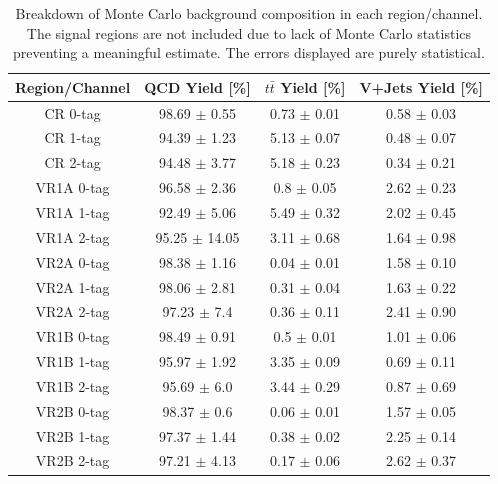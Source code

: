 \begin{table}[!htb]
\begin{center}
\begin{tabular}{|c|c|c|c|}
\hline
Region/Channel & QCD Yield [\%] & $t\bar{t}$ Yield [\%] & V+Jets Yield [\%]  \\ \hline
CR 0-tag & 98.69 $\pm$ 0.55 & 0.73 $\pm$ 0.01 & 0.58 $\pm$ 0.03 \\
\hline
CR 1-tag & 94.39 $\pm$ 1.23 & 5.13 $\pm$ 0.07 & 0.48 $\pm$ 0.07 \\
\hline
CR 2-tag & 94.48 $\pm$ 3.77 & 5.18 $\pm$ 0.23 & 0.34 $\pm$ 0.21 \\
\hline
VR1A 0-tag & 96.58 $\pm$ 2.36 & 0.8 $\pm$ 0.05 & 2.62 $\pm$ 0.23 \\
\hline
VR1A 1-tag & 92.49 $\pm$ 5.06 & 5.49 $\pm$ 0.32 & 2.02 $\pm$ 0.45 \\
\hline
VR1A 2-tag & 95.25 $\pm$ 14.05 & 3.11 $\pm$ 0.68 & 1.64 $\pm$ 0.98 \\
\hline
VR2A 0-tag & 98.38 $\pm$ 1.16 & 0.04 $\pm$ 0.01 & 1.58 $\pm$ 0.10 \\
\hline
VR2A 1-tag & 98.06 $\pm$ 2.81 & 0.31 $\pm$ 0.04 & 1.63 $\pm$ 0.22 \\
\hline
VR2A 2-tag & 97.23 $\pm$ 7.4 & 0.36 $\pm$ 0.11 & 2.41 $\pm$ 0.90 \\
\hline
VR1B 0-tag & 98.49 $\pm$ 0.91 & 0.5 $\pm$ 0.01 & 1.01 $\pm$ 0.06 \\
\hline
VR1B 1-tag & 95.97 $\pm$ 1.92 & 3.35 $\pm$ 0.09 & 0.69 $\pm$ 0.11 \\
\hline
VR1B 2-tag & 95.69 $\pm$ 6.0 & 3.44 $\pm$ 0.29 & 0.87 $\pm$ 0.69 \\
\hline
VR2B 0-tag & 98.37 $\pm$ 0.6 & 0.06 $\pm$ 0.01 & 1.57 $\pm$ 0.05 \\
\hline
VR2B 1-tag & 97.37 $\pm$ 1.44 & 0.38 $\pm$ 0.02 & 2.25 $\pm$ 0.14 \\
\hline
VR2B 2-tag & 97.21 $\pm$ 4.13 & 0.17 $\pm$ 0.06 & 2.62 $\pm$ 0.37 \\
\hline
\end{tabular}
\caption{Breakdown of Monte Carlo background composition in each region/channel.
         The signal regions are not included due to lack of Monte Carlo statistics preventing a meaningful estimate.
         The errors displayed are purely statistical.
     }
\label{tab:bkg_comp}
\end{center}
\end{table}

